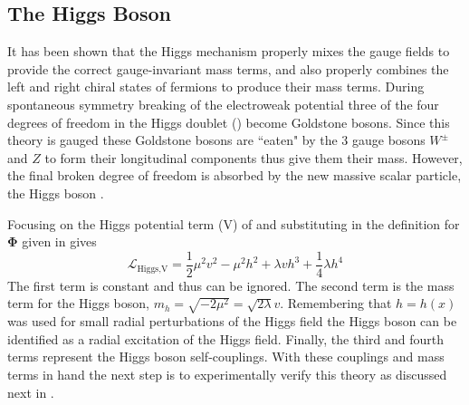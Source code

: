 \subsection{The Higgs Boson}

It has been shown that the Higgs mechanism properly mixes the gauge fields to
provide the correct gauge-invariant mass terms, and also properly combines the
left and right chiral states of fermions to produce their mass terms.  During
spontaneous symmetry breaking of the electroweak potential three of the four
degrees of freedom in the Higgs doublet () become
Goldstone bosons.  Since this theory is gauged these Goldstone bosons are
``eaten" by the 3 gauge bosons $W^{\pm}$ and $Z$ to form their longitudinal
components thus give them their mass.  However, the final broken degree of
freedom is absorbed by the new massive scalar particle, the Higgs boson
\cite{Higgs:1964pj}.

Focusing on the Higgs potential term (V) of
 and substituting in the definition for
$\boldsymbol{\Phi}$ given in  gives
%
\begin{equation}
\mathcal{L}_\text{Higgs,V} = \frac{1}{2} \mu^{2} v^{2} - \mu^{2} h^{2} +
\lambda v h^{3} + \frac{1}{4} \lambda h^{4}
\end{equation}
%
The first term is constant and thus can be ignored.  The second term is the
mass term for the Higgs boson, $m_h = \sqrt{-2\mu^{2}} = \sqrt{2\lambda}v$.
Remembering that $h = h(x)$ was used for small radial perturbations of the
Higgs field the Higgs boson can be identified as a radial excitation of the
Higgs field.  Finally, the third and fourth terms represent the Higgs boson
self-couplings.  With these couplings and mass terms in hand the next step is
to experimentally verify this theory as discussed next in .

